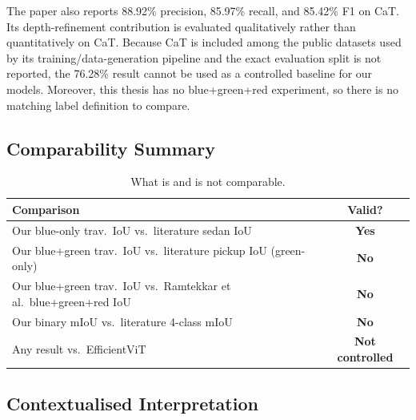 \documentclass[12pt,a4paper]{report}
\begin{document}
The paper also reports 88.92\% precision, 85.97\% recall, and 85.42\% F1 on
CaT. Its depth-refinement contribution is evaluated qualitatively rather than
quantitatively on CaT. Because CaT is included among the public datasets used
by its training/data-generation pipeline and the exact evaluation split is not
reported, the 76.28\% result cannot be used as a controlled baseline for our
models. Moreover, this thesis has no blue+green+red experiment, so there is no
matching label definition to compare.

\subsection{Comparability Summary}

\begin{table}[H]
\centering
\caption{What is and is not comparable.}
\label{tab:comparability}
\small
\begin{tabularx}{\textwidth}{@{}Xc@{}}
\toprule
\textbf{Comparison} & \textbf{Valid?} \\
\midrule
Our blue-only trav.\ IoU vs.\ literature sedan IoU               & \textcolor{good}{\textbf{Yes}} \\
Our blue+green trav.\ IoU vs.\ literature pickup IoU (green-only) & \textcolor{safety}{\textbf{No}} \\
Our blue+green trav.\ IoU vs.\ Ramtekkar et al.\ blue+green+red IoU & \textcolor{safety}{\textbf{No}} \\
Our binary mIoU vs.\ literature 4-class mIoU                      & \textcolor{safety}{\textbf{No}} \\
Any result vs.\ EfficientViT~\cite{efficientvit_offroad}          & \textcolor{warn}{\textbf{Not controlled}} \\
\bottomrule
\end{tabularx}
\end{table}

\subsection{Contextualised Interpretation}
\end{document}
